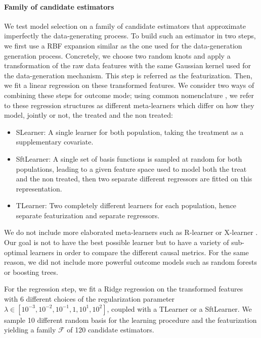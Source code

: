 \documentclass[10pt]{article}
\begin{document}
\begin{multicols}{2}
    \paragraph{Family of candidate estimators}

    We test model selection on a family of candidate estimators that
    approximate imperfectly the data-generating process. To build such an
    estimator in two steps, we first use a RBF expansion
    similar as the one used for the data-generation generation process. Concretely,
    we choose two random knots and apply a transformation of the raw data features
    with the same Gaussian kernel used for the data-generation mechanism. This step
    is referred as the featurization. Then, we fit a linear regression on
    these
    transformed features. We consider two ways of combining these steps for outcome
    mode; using common nomenclature \cite{kunzel_metalearners_2019}, we refer
    to these regression structures as different meta-learners which differ on how
    they model, jointly or not, the treated and the non treated:
    \begin{itemize}
        \item SLearner: A single learner for both population, taking the treatment as
              a supplementary covariate.

        \item SftLearner: A single set of basis functions is sampled at random for both
              populations, leading to a given feature space used to model both the treat and
              the non treated, then two
              separate different regressors are fitted on this representation.
        \item TLearner: Two completely different learners for each population, hence
              separate featurization and separate regressors.
    \end{itemize}

    We do not include more elaborated meta-learners such as R-learner
    \cite{nie_quasioracle_2017} or X-learner
    \cite{kunzel_metalearners_2019}. Our goal is not to have the best possible
    learner but to have a variety of sub-optimal learners in order to compare the
    different causal metrics. For the same reason, we did not include more powerful
    outcome models such as random forests or boosting trees.

    For the regression step, we fit a Ridge regression on the transformed features
    with 6 different choices of the regularization parameter $\lambda \in [10^{-3},
            10^{-2}, 10^{-1}, 1, 10^{1}, 10^{2}]$, coupled with a TLearner or a SftLearner.
    We sample 10 different random basis for the learning procedure and the
    featurization yielding a family $\mathcal F$ of 120 candidate estimators.


\end{multicols}
\end{document}
